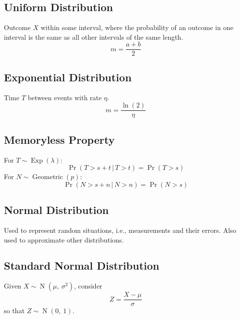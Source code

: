 \documentclass{article}
\begin{document}
\begin{minipage}{62.39259259mm}
    \subsection{Uniform Distribution}
    Outcome \(X\) within some interval, where the probability of an outcome in one interval is the same as all other intervals of the same length.
    \begin{equation*}
        m = \frac{a + b}{2}
    \end{equation*}
    \subsection{Exponential Distribution}
    Time \(T\) between events with rate \(\eta\).
    \begin{equation*}
        m = \frac{\ln{\left( 2 \right)}}{\eta}
    \end{equation*}
    \subsection{Memoryless Property}
    For \(T \sim \operatorname{Exp}{\left( \lambda \right)}\):
    \begin{equation*}
        \Pr{\left( T > s + t \,\vert\, T > t \right)} = \Pr{\left( T > s \right)}
    \end{equation*}
    For \(N \sim \operatorname{Geometric}{\left( p \right)}\):
    \begin{equation*}
        \Pr{\left( N > s + n \,\vert\, N > n \right)} = \Pr{\left( N > s \right)}
    \end{equation*}
    \subsection{Normal Distribution}
    Used to represent random situations, i.e., measurements and their errors.
    Also used to approximate other distributions.
    \subsection{Standard Normal Distribution}
    Given \(X \sim \operatorname{N}{\left( \mu,\: \sigma^2 \right)}\), consider
    \begin{equation*}
        Z = \frac{X - \mu}{\sigma}
    \end{equation*}
    so that \(Z \sim \operatorname{N}{\left( 0,\: 1 \right)}\).
\end{minipage}\hfill%
\end{document}
